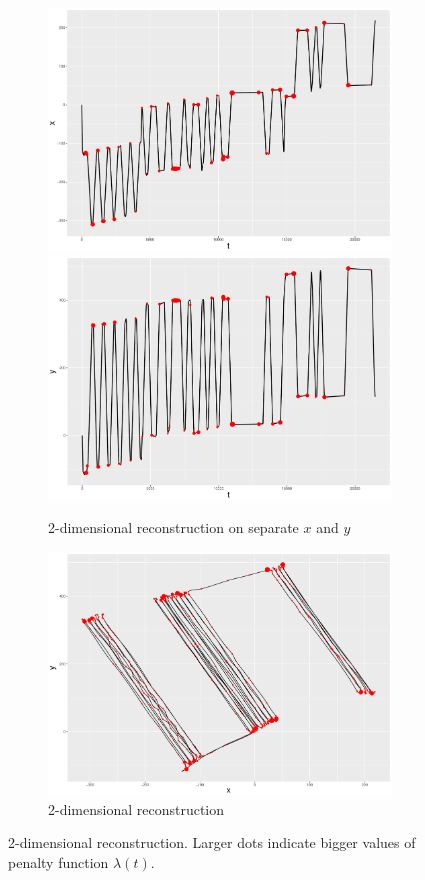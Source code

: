 \begin{figure}
  \centering
 \begin{subfigure}{\textwidth}
     \centering
     \includegraphics[width=0.45\linewidth]{Chapters/02TractorSplineTheory/plot/ggplot/ggRealdataXYPenaltyPathofX2.pdf}
     \includegraphics[width=0.45\linewidth]{Chapters/02TractorSplineTheory/plot/ggplot/ggRealdataXYPenaltyPathofY2.pdf}
     \caption{2-dimensional reconstruction on separate $x$ and $y$}
     \end{subfigure}
     \begin{subfigure}{\textwidth}
     \centering
     \includegraphics[width=0.9\linewidth]{Chapters/02TractorSplineTheory/plot/ggplot/ggRealdataXYPenaltyPathofXY2.pdf}
     \caption{2-dimensional reconstruction}
     \end{subfigure}
 \caption{2-dimensional reconstruction. Larger dots indicate bigger values of penalty function $\lambda(t)$.}\label{completecombind2dxy}
\end{figure}

